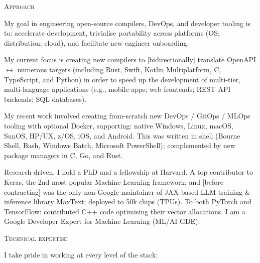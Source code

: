 \documentclass[11pt, a4paper]{article}
\newcommand{\headright}[1]{\vspace*{2.5ex}\textsc{\Large\color{cvblue}#1}\par%
     \vspace*{-2ex}{\color{cvblue}\hrulefill}\par}
\begin{document}
\begin{minipage}[t]{0.56\textwidth}
\setlength{\parskip}{0.8ex}%

\vspace{2ex}
\hypersetup{urlcolor=black}
\hypersetup{linkcolor=black}

\headright{Approach}
My goal in engineering open-source compilers, DevOps, and developer tooling is to: accelerate development, trivialise portability across platforms (OS; distribution; cloud), and facilitate new engineer onboarding.

My current focus is creating new compilers to [bidirectionally] translate OpenAPI \(\leftrightarrow\) numerous targets (including Rust, Swift, Kotlin Multiplatform, C, TypeScript, and Python) in order to speed up the development of multi-tier, multi-language applications (e.g., mobile apps; web frontends; REST API backends; SQL databases).

My recent work involved creating from-scratch new DevOps / GitOps / MLOps tooling with optional Docker, supporting: native Windows, Linux, macOS, SunOS, HP/UX, z/OS, iOS, and Android.  This was written in shell (Bourne Shell, Bash, Windows Batch, Microsoft PowerShell); complemented by new package managers in C, Go, and Rust.

Research driven, I hold a PhD and a fellowship at Harvard. A top contributor to Keras, the 2nd most popular Machine Learning framework; and [before contracting] was the only non-Google maintainer of JAX-based LLM training \& inference library MaxText; deployed to 50k chips (TPUs). To both PyTorch and TensorFlow: contributed C++ code optimising their vector allocations. I am a Google Developer Expert for Machine Learning (ML/AI GDE).

\headright{Technical expertise}
I take pride in working at every level of the stack:


\end{minipage}
\end{document}
